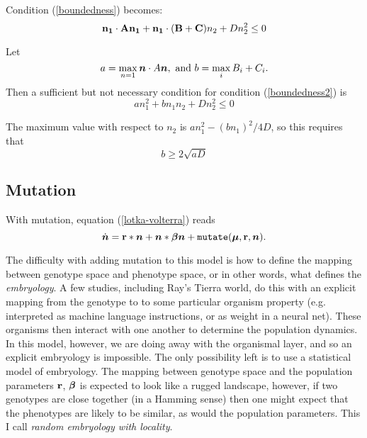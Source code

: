 Condition (\ref{boundedness}) becomes:
\begin{equation}\label{boundedness2}
{\bf n_1}\cdot{\bf A}{\bf n_1} + {\bf n_1}\cdot({\bf B}+{\bf C})n_2 +
Dn_2^2 \leq 0
\end{equation}

Let 
\begin{displaymath}
a=\max_{n=1} \mbox{\boldmath{$n$}}\cdot A\mbox{\boldmath{$n$}},\mbox{ and } b=\max_{i}B_i+C_i.
\end{displaymath}
 Then a sufficient but
not necessary condition for condition (\ref{boundedness2}) is
\begin{displaymath}
an_1^2+bn_1n_2+Dn_2^2\leq0
\end{displaymath}

The maximum value with respect to $n_2$ is $an_1^2-(bn_1)^2/4D$, so
this requires that
\begin{equation}\label{boundedness3}
b \geq 2\sqrt{aD}
\end{equation}

\subsection{Mutation}\label{mutation}

With mutation, equation (\ref{lotka-volterra}) reads
\begin{equation}
\dot{\mbox{\boldmath{$n$}}} = \mbox{${\bf r}$}*\mbox{\boldmath{$n$}} + \mbox{\boldmath{$n$}}*\mbox{\boldmath{$\beta$}}\mbox{\boldmath{$n$}} + {\tt mutate}(\mbox{\boldmath{$\mu$}},\mbox{${\bf r}$},\mbox{\boldmath{$n$}}).
\end{equation}


The difficulty with adding mutation to this model is how to define the
mapping between genotype space and phenotype space, or in other words,
what defines the {\em embryology}. A few studies, including Ray's
Tierra world, do this with an explicit mapping from the genotype to to
some particular organism property (e.g. interpreted as machine language
instructions, or as weight in a neural net). These organisms then
interact with one another to determine the population dynamics. In
this model, however, we are doing away with the organismal layer, and
so an explicit embryology is impossible. The only possibility left is
to use a statistical model of embryology. The mapping between
genotype space and the population parameters $\mbox{${\bf r}$}$,
$\mbox{\boldmath{$\beta$}}{}$  is expected to look like a rugged
landscape, however, if two genotypes are close together (in a Hamming
sense) then one might expect that the phenotypes are likely to be
similar, as would the population parameters. This I call {\em random
embryology with locality}.

